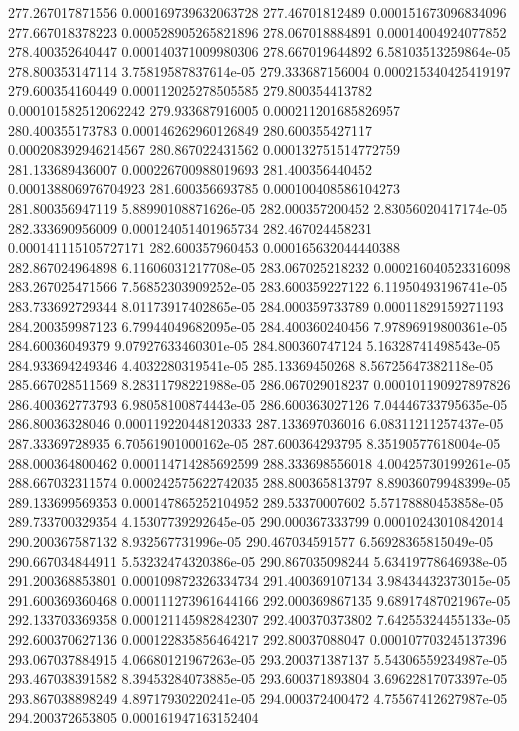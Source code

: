 {277.267017871556 0.000169739632063728
277.46701812489 0.000151673096834096
277.667018378223 0.000528905265821896
278.067018884891 0.00014004924077852
278.400352640447 0.000140371009980306
278.667019644892 6.58103513259864e-05
278.800353147114 3.75819587837614e-05
279.333687156004 0.000215340425419197
279.600354160449 0.000112025278505585
279.800354413782 0.000101582512062242
279.933687916005 0.000211201685826957
280.400355173783 0.000146262960126849
280.600355427117 0.000208392946214567
280.867022431562 0.000132751514772759
281.133689436007 0.000226700988019693
281.400356440452 0.000138806976704923
281.600356693785 0.000100408586104273
281.800356947119 5.88990108871626e-05
282.000357200452 2.83056020417174e-05
282.333690956009 0.000124051401965734
282.467024458231 0.000141115105727171
282.600357960453 0.000165632044440388
282.867024964898 6.11606031217708e-05
283.067025218232 0.000216040523316098
283.267025471566 7.56852303909252e-05
283.600359227122 6.11950493196741e-05
283.733692729344 8.01173917402865e-05
284.000359733789 0.00011829159271193
284.200359987123 6.79944049682095e-05
284.400360240456 7.97896919800361e-05
284.60036049379 9.07927633460301e-05
284.800360747124 5.16328741498543e-05
284.933694249346 4.4032280319541e-05
285.13369450268 8.56725647382118e-05
285.667028511569 8.28311798221988e-05
286.067029018237 0.000101190927897826
286.400362773793 6.98058100874443e-05
286.600363027126 7.04446733795635e-05
286.80036328046 0.000119220448120333
287.133697036016 6.08311211257437e-05
287.33369728935 6.70561901000162e-05
287.600364293795 8.35190577618004e-05
288.000364800462 0.000114714285692599
288.333698556018 4.00425730199261e-05
288.667032311574 0.000242575622742035
288.800365813797 8.89036079948399e-05
289.133699569353 0.000147865252104952
289.53370007602 5.57178880453858e-05
289.733700329354 4.15307739292645e-05
290.000367333799 0.00010243010842014
290.200367587132 8.932567731996e-05
290.467034591577 6.56928365815049e-05
290.667034844911 5.53232474320386e-05
290.867035098244 5.63419778646938e-05
291.200368853801 0.000109872326334734
291.400369107134 3.98434432373015e-05
291.600369360468 0.000111273961644166
292.000369867135 9.68917487021967e-05
292.133703369358 0.000121145982842307
292.400370373802 7.64255324455133e-05
292.600370627136 0.000122835856464217
292.80037088047 0.000107703245137396
293.067037884915 4.06680121967263e-05
293.200371387137 5.54306559234987e-05
293.467038391582 8.39453284073885e-05
293.600371893804 3.69622817073397e-05
293.867038898249 4.89717930220241e-05
294.000372400472 4.75567412627987e-05
294.200372653805 0.000161947163152404
}
